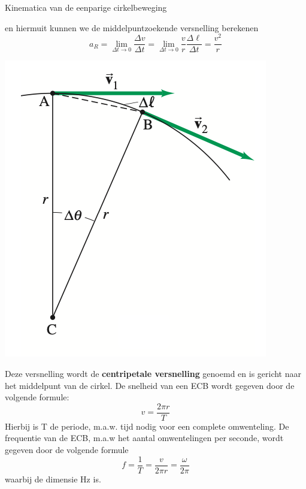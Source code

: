 \begin{theo}{Kinematica van de eenparige cirkelbeweging}
\begin{minipage}{.71\textwidth}
        \noindent en hiermuit kunnen we de middelpuntzoekende versnelling berekenen
        \begin{equation*}
            a_R = \lim_{\Delta t \to 0} \frac{\Delta v}{\Delta t} = \lim_{\Delta t \to 0} \frac{v}{r}\frac{\Delta \ell}{\Delta t} = \frac{v^2}{r}
        \end{equation*}
    \end{minipage} 
    \begin{minipage}{.25\textwidth}
        \includegraphics[scale = 0.3]{Images/Dynamica/Kinematica van de Cirkelbeweging.png}      
    \end{minipage}
    \vspace{0.3cm}

    \noindent Deze versnelling wordt de \textbf{centripetale versnelling} genoemd en is gericht naar het middelpunt van de cirkel. De snelheid van een ECB wordt gegeven door de volgende formule: 
    \begin{equation*}
        v = \dfrac{2\pi r}{T}
    \end{equation*}
    \noindent Hierbij is T de periode, m.a.w. tijd nodig voor een complete omwenteling. De frequentie van de ECB, m.a.w het aantal omwentelingen per seconde, wordt gegeven door de volgende formule
    \begin{equation*}
        f = \dfrac{1}{T} = \dfrac{v}{2\pi r} = \dfrac{\omega}{2\pi}
    \end{equation*}
    waarbij de dimensie Hz is.
\end{theo}

